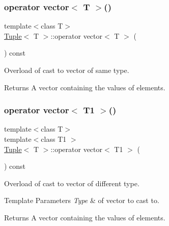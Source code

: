 \mbox{\label{class_tuple_a4189d6fe009e00fbc81061bcad9ee856}} 
\subsubsection{\texorpdfstring{operator vector$<$ T $>$()}{operator vector< T >()}}
{\footnotesize\ttfamily template$<$class T$>$ \\
\mbox{\hyperlink{class_tuple}{Tuple}}$<$ T $>$\+::operator vector$<$ T $>$ (\begin{DoxyParamCaption}{ }\end{DoxyParamCaption}) const\hspace{0.3cm}{\ttfamily [inline]}}



Overload of cast to vector of same type. 

\begin{DoxyReturn}{Returns}
A vector containing the values of elements. 
\end{DoxyReturn}
\mbox{\label{class_tuple_a924a25df1578ffab148c69a1a1000491}} 
\subsubsection{\texorpdfstring{operator vector$<$ T1 $>$()}{operator vector< T1 >()}}
{\footnotesize\ttfamily template$<$class T$>$ \\
template$<$class T1 $>$ \\
\mbox{\hyperlink{class_tuple}{Tuple}}$<$ T $>$\+::operator vector$<$ T1 $>$ (\begin{DoxyParamCaption}{ }\end{DoxyParamCaption}) const\hspace{0.3cm}{\ttfamily [inline]}}



Overload of cast to vector of different type. 


\begin{DoxyTemplParams}{Template Parameters}
{\em Type} & of vector to cast to. \\
\hline
\end{DoxyTemplParams}
\begin{DoxyReturn}{Returns}
A vector containing the values of elements. 
\end{DoxyReturn}
\mbox{\label{class_tuple_af41b573429ba5d8fc0b5576b7b41e818}} 
